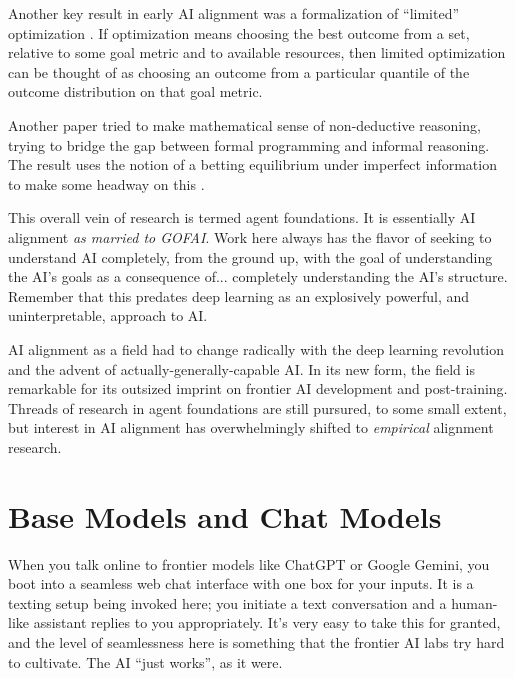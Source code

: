 Another key result in early AI alignment was a formalization of ``limited''
optimization \cite{taylor2016quantilizers}. If optimization means choosing the
best outcome from a set, relative to some goal metric and to available
resources, then limited optimization can be thought of as choosing an outcome
from a particular quantile of the outcome distribution on that goal metric.

Another paper tried to make mathematical sense of non-deductive reasoning,
trying to bridge the gap between formal programming and informal reasoning. The
result uses the notion of a betting equilibrium under imperfect information to
make some headway on this \cite{garrabrant2020induction}.

This overall vein of research is termed agent foundations. It is essentially
AI alignment \emph{as married to GOFAI}. Work here always has the flavor of
seeking to understand AI completely, from the ground up, with the goal of
understanding the AI's goals as a consequence of... completely understanding
the AI's structure. Remember that this predates deep learning as an explosively
powerful, and uninterpretable, approach to AI.

AI alignment as a field had to change radically with the deep learning
revolution and the advent of actually-generally-capable AI. In its new form,
the field is remarkable for its outsized imprint on frontier AI development and
post-training. Threads of research in agent foundations are still pursured, to
some small extent, but interest in AI alignment has overwhelmingly shifted to
\emph{empirical} alignment research.

\section{Base Models and Chat Models}
When you talk online to frontier models like ChatGPT or Google Gemini, you boot
into a seamless web chat interface with one box for your inputs. It is a
texting setup being invoked here; you initiate a text conversation and a
human-like assistant replies to you appropriately. It's very easy to take this
for granted, and the level of seamlessness here is something that the frontier
AI labs try hard to cultivate. The AI ``just works'', as it were.

